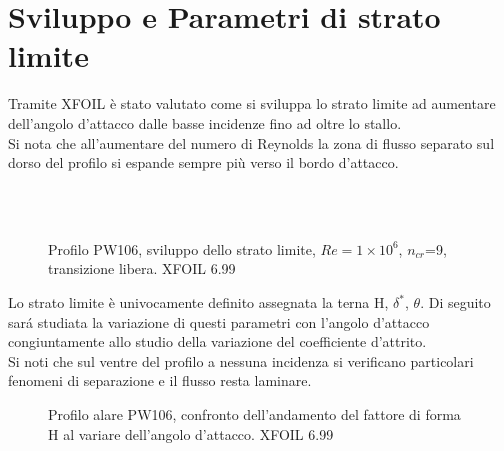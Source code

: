 \section{Sviluppo e Parametri di strato limite}
Tramite XFOIL è stato valutato come si sviluppa lo strato limite ad aumentare dell’angolo d’attacco dalle basse incidenze fino ad oltre lo stallo.\\ 
Si nota che all'aumentare del numero di Reynolds la zona di flusso separato sul dorso del profilo si espande sempre più  verso il bordo d'attacco.
\begin{figure}[H]
\centering
{} \\
 \\
\caption{\footnotesize Profilo PW106, sviluppo dello strato limite, $Re=1\times10^6$, $n_{cr}$=9, transizione libera. XFOIL 6.99}
\label{fig:subfig2}
\end{figure}

Lo strato limite è univocamente definito assegnata la terna H, ${\delta^*}$, ${\theta}$. Di seguito sará studiata la variazione di questi parametri con l’angolo d’attacco congiuntamente allo studio della variazione del coefficiente d’attrito.\\
Si noti che sul ventre del profilo a nessuna incidenza si verificano particolari fenomeni di separazione e il flusso resta laminare.

\begin{figure} [H]
\centering
{}
\caption{\footnotesize Profilo alare PW106, confronto dell'andamento del fattore di forma H al variare dell'angolo d'attacco. XFOIL 6.99}
\end{figure}
\noindent



